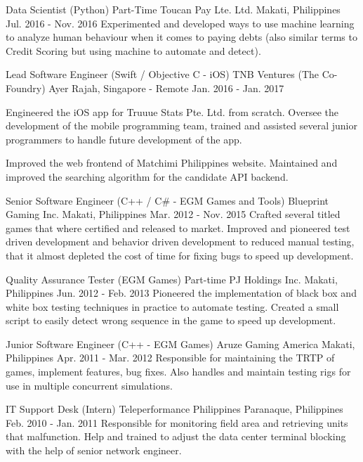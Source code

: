 \begin{cventries}
    \cventry
        {Data Scientist (Python) Part-Time}
        {Toucan Pay Lte. Ltd.}
        {Makati, Philippines}
        {Jul. 2016 - Nov. 2016}
        {Experimented and developed ways to use machine learning to analyze human behaviour when it comes to paying debts (also similar terms to Credit Scoring but using machine to automate and detect).}
        
    \cventry
        {Lead Software Engineer (Swift / Objective C - iOS)}
        {TNB Ventures (The Co-Foundry)}
        {Ayer Rajah, Singapore - Remote}
        {Jan. 2016 - Jan. 2017}
        {
            \begin{cvitems}
                \item
                    {Engineered the iOS app for Truuue Stats Pte. Ltd. from scratch. Oversee the development of the mobile programming team, trained and assisted several junior programmers to handle future development of the app.}
                \item
                    {Improved the web frontend of Matchimi Philippines website. Maintained and improved the searching algorithm for the candidate API backend.}
            \end{cvitems}
        }
    
    \cventry
        {Senior Software Engineer (C++ / C\# - EGM Games and Tools)}
        {Blueprint Gaming Inc.}
        {Makati, Philippines}
        {Mar. 2012 - Nov. 2015}
        {Crafted several titled games that where certified and released to market. Improved and pioneered test driven development and behavior driven development to reduced manual testing, that it almost depleted the cost of time for fixing bugs to speed up development.}
        
    \cventry
        {Quality Assurance Tester (EGM Games) Part-time}
        {PJ Holdings Inc.}
        {Makati, Philippines}
        {Jun. 2012 - Feb. 2013}
        {Pioneered the implementation of black box and white box testing techniques in practice to automate testing. Created a small script to easily detect wrong sequence in the game to speed up development.}
        
    \cventry
        {Junior Software Engineer (C++ - EGM Games)}
        {Aruze Gaming America}
        {Makati, Philippines}
        {Apr. 2011 - Mar. 2012}
        {Responsible for maintaining the TRTP of games, implement features, bug fixes. Also handles and maintain testing rigs for use in multiple concurrent simulations.}

    \cventry
        {IT Support Desk (Intern)}
        {Teleperformance Philippines}
        {Paranaque, Philippines}
        {Feb. 2010 - Jan. 2011}
        {Responsible for monitoring field area and retrieving units that malfunction. Help and trained to adjust the data center terminal blocking with the help of senior network engineer.}

\end{cventries}

\vspace{1mm}